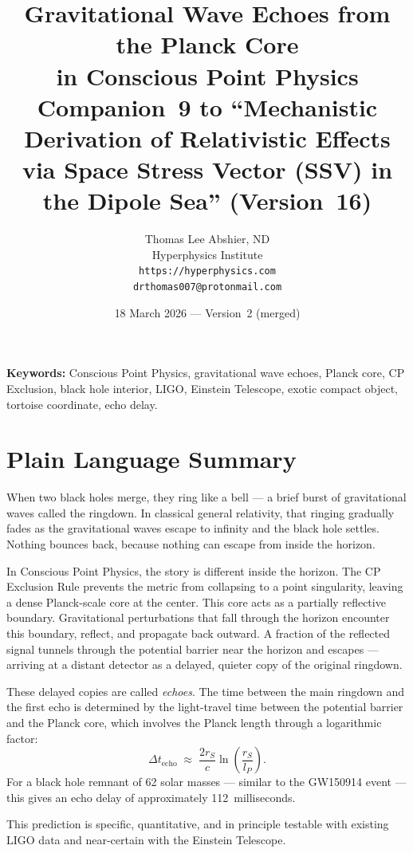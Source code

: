 \documentclass[12pt]{article}
\title{\textbf{Gravitational Wave Echoes from the Planck Core\\
in Conscious Point Physics}\\[6pt]
{\large Companion~9 to ``Mechanistic Derivation of Relativistic Effects\\
via Space Stress Vector (SSV) in the Dipole Sea'' (Version~16)}}
\author{Thomas Lee Abshier, ND\\
Hyperphysics Institute\\
\texttt{https://hyperphysics.com}\\
\texttt{drthomas007@protonmail.com}}
\date{18 March 2026 --- Version~2 (merged)}
\newcommand{\lP}{l_P}
\newcommand{\rS}{r_S}
\newcommand{\Dt}{\Delta t_{\mathrm{echo}}}
\begin{document}
\maketitle

\noindent\textbf{Keywords:} Conscious Point Physics, gravitational wave echoes,
Planck core, CP Exclusion, black hole interior, LIGO, Einstein Telescope,
exotic compact object, tortoise coordinate, echo delay.

\section*{Plain Language Summary}

When two black holes merge, they ring like a bell — a brief burst of
gravitational waves called the ringdown.  In classical general relativity,
that ringing gradually fades as the gravitational waves escape to infinity
and the black hole settles.  Nothing bounces back, because nothing can
escape from inside the horizon.

In Conscious Point Physics, the story is different inside the horizon.
The CP Exclusion Rule prevents the metric from collapsing to a point
singularity, leaving a dense Planck-scale core at the center.  This core
acts as a partially reflective boundary.  Gravitational perturbations that
fall through the horizon encounter this boundary, reflect, and propagate
back outward.  A fraction of the reflected signal tunnels through the
potential barrier near the horizon and escapes — arriving at a distant
detector as a delayed, quieter copy of the original ringdown.

These delayed copies are called \emph{echoes}.  The time between the main
ringdown and the first echo is determined by the light-travel time between
the potential barrier and the Planck core, which involves the Planck length
through a logarithmic factor:
$$\Dt \;\approx\; \frac{2\rS}{c}\ln\!\left(\frac{\rS}{\lP}\right).$$
For a black hole remnant of 62 solar masses — similar to the GW150914 event
— this gives an echo delay of approximately 112~milliseconds.

This prediction is specific, quantitative, and in principle testable with
existing LIGO data and near-certain with the Einstein Telescope.
\end{document}
